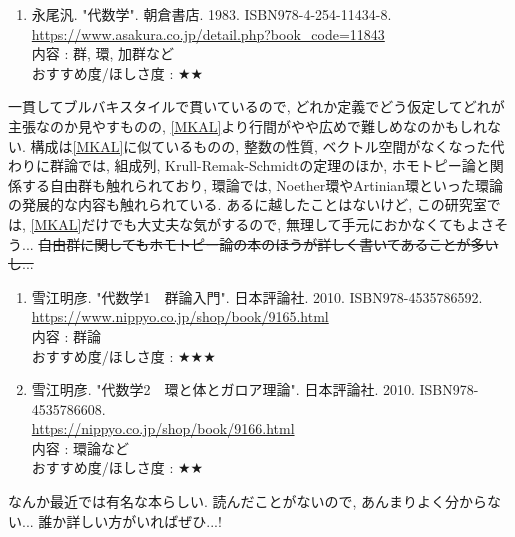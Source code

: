\documentclass[10pt,a4paper]{jsarticle}
\begin{document}
    \begin{enumerate}
        \renewcommand{\theenumi}{[AL\arabic{enumi}]}
        \renewcommand{\labelenumi}{\theenumi}
        \setcounter{enumi}{1}
        \item \label{NHAL} 永尾汎. "代数学". 朝倉書店. 1983. ISBN978-4-254-11434-8. \\
        \url{https://www.asakura.co.jp/detail.php?book_code=11843} \\
        内容 : 群, 環, 加群など\\
        おすすめ度/ほしさ度 : $\bigstar \bigstar $ 
    \end{enumerate}\par
    一貫してブルバキスタイルで貫いているので, どれか定義でどう仮定してどれが主張なのか見やすものの, \ref{MKAL}より行間がやや広めで難しめなのかもしれない. 構成は\ref{MKAL}に似ているものの, 整数の性質, ベクトル空間がなくなった代わりに群論では, 組成列, Krull-Remak-Schmidtの定理のほか, ホモトピー論と関係する自由群も触れられており, 環論では, Noether環やArtinian環といった環論の発展的な内容も触れられている. あるに越したことはないけど, この研究室では, \ref{MKAL}だけでも大丈夫な気がするので, 無理して手元におかなくてもよさそう... \sout{自由群に関してもホモトピー論の本のほうが詳しく書いてあることが多いし...} 
    \begin{enumerate}
        \renewcommand{\theenumi}{[AL\arabic{enumi}]}
        \renewcommand{\labelenumi}{\theenumi}
        \setcounter{enumi}{2}
        \item \label{YAAL1} 雪江明彦. "代数学1　群論入門". 日本評論社. 2010. ISBN978-4535786592. \\
        \url{https://www.nippyo.co.jp/shop/book/9165.html} \\
        内容 : 群論\\
        おすすめ度/ほしさ度 : $\bigstar \bigstar \bigstar $ 
        \item \label{YAAL2} 雪江明彦. "代数学2　環と体とガロア理論". 日本評論社. 2010. ISBN978-4535786608. \\
        \url{https://nippyo.co.jp/shop/book/9166.html} \\
        内容 : 環論など\\
        おすすめ度/ほしさ度 : $\bigstar \bigstar $ 
    \end{enumerate}\par
    なんか最近では有名な本らしい. 読んだことがないので, あんまりよく分からない... 誰か詳しい方がいればぜひ...! 
\end{document}
